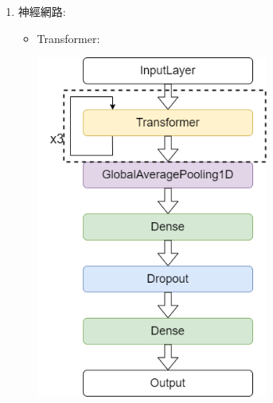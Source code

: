 \documentclass[12pt,a4paper]{report}
\begin{document}
\begin{CJK*}{UTF8}{bkai}
\begin{enumerate}
        \item 神經網路:
              \begin{itemize}
                  \item Transformer:
                        \par
                        \includegraphics[width=3in]{transformer_model.png}
                        \newpage


\end{itemize}
\end{enumerate}
\end{CJK*}
\end{document}
